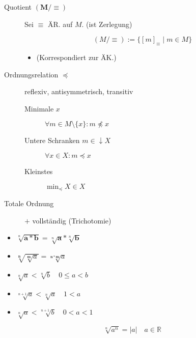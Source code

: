 \documentclass[uniLeipzig]{merkzettel}
\begin{document}
\begin{mzImportant}
\begin{description}
    \item [Quotient $\mathbf{(M / \equiv)}$]
          Sei $\equiv$ ÄR. auf $M$. (ist Zerlegung)

          $$(M / \equiv) := \{ [m]_\equiv \mid m \in M \}$$

          \begin{itemize}
            \item (Korrespondiert zur ÄK.)
          \end{itemize}

    \item [Ordnungsrelation $\boldsymbol{\preceq}$]
          reflexiv, antisymmetrisch, transitiv

          \begin{description}
            \item [Minimale $x$] $\forall m \in M \setminus \{ x \}: m \not\preceq x$

            \item [Untere Schranken $m \in \downarrow X$] $\forall x \in X: m \preceq x$

            \item [Kleinstes] $\min_\preceq X \in X$
          \end{description}

    \item [Totale Ordnung] $+$ vollständig (Trichotomie)
  \end{description}
\end{mzImportant}

\begin{mzImportant}
  \begin{itemize}
    \item $\sqrt[n]{\mathbf{a * b}} = \sqrt[n]{\mathbf{a}} \mathbin{\boldsymbol{*}} \sqrt[n]{\mathbf{b}}$

    \item $\sqrt[\mathbf{n}]{ \sqrt[\mathbf{m}]{a} } = \sqrt[\mathbf{n * m}]{a}$

    \item $\sqrt[n]{a} < \sqrt[n]{b} \quad 0 \leq a < b$

    \item $\sqrt[n+1]{a} < \sqrt[n]{a} \quad 1 < a$

    \item $\sqrt[n]{a} < \sqrt[n+1]{b} \quad 0 < a < 1$
  \end{itemize}

  $$\sqrt[n]{a^n} = |a| \quad a \in \mathbb{R}$$
\end{mzImportant}
\end{document}
